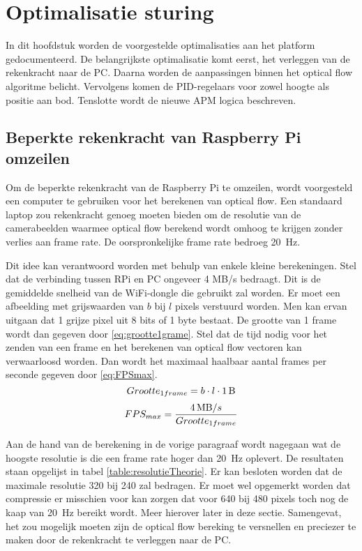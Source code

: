 \chapter{Optimalisatie sturing}
In dit hoofdstuk worden de voorgestelde optimalisaties aan het platform gedocumenteerd. De belangrijkste optimalisatie komt eerst, het verleggen van de rekenkracht naar de PC. Daarna worden de aanpassingen binnen het optical flow algoritme belicht. Vervolgens komen de PID-regelaars voor zowel hoogte als positie aan bod. Tenslotte wordt de nieuwe APM logica beschreven.

\section{Beperkte rekenkracht van Raspberry Pi omzeilen}
Om de beperkte rekenkracht van de Raspberry Pi te omzeilen, wordt voorgesteld een computer te gebruiken voor het berekenen van optical flow. Een standaard laptop zou rekenkracht genoeg moeten bieden om de resolutie van de camerabeelden waarmee optical flow berekend wordt omhoog te krijgen zonder verlies aan frame rate. De oorspronkelijke frame rate bedroeg \SI{20}{\Hz}.

\npar Dit idee kan verantwoord worden met behulp van enkele kleine berekeningen. Stel dat de verbinding tussen RPi en PC ongeveer 4 MB/s bedraagt. Dit is de gemiddelde snelheid van de WiFi-dongle die gebruikt zal worden. Er moet een afbeelding met grijswaarden van $b$ bij $l$ pixels verstuurd worden. Men kan ervan uitgaan dat 1 grijze pixel uit 8 bits of 1 byte bestaat. De grootte van 1 frame wordt dan gegeven door \eqref{eq:grootte1grame}. Stel dat de tijd nodig voor het zenden van een frame en het berekenen van optical flow vectoren kan verwaarloosd worden. Dan wordt het maximaal haalbaar aantal frames per seconde gegeven door \eqref{eq:FPSmax}.
\begin{equation}
Grootte_{1frame} = b \cdot l \cdot \SI{1}{\byte} 
\label{eq:grootte1grame}
\end{equation}
\begin{equation}
FPS_{max} = \frac{\SI{4}{\mega\byte}/s}{Grootte_{1frame}}
\label{eq:FPSmax}
\end{equation}

\npar Aan de hand van de berekening in de vorige paragraaf wordt nagegaan wat de hoogste resolutie is die een frame rate hoger dan \SI{20}{\Hz} oplevert. De resultaten staan opgelijst in tabel \ref{table:resolutieTheorie}. Er kan besloten worden dat de maximale resolutie 320 bij 240 zal bedragen. Er moet wel opgemerkt worden dat compressie er misschien voor kan zorgen dat voor 640 bij 480 pixels toch nog de kaap van \SI{20}{\Hz} bereikt wordt. Meer hierover later in deze sectie. Samengevat, het zou mogelijk moeten zijn de optical flow bereking te versnellen en preciezer te maken door de rekenkracht te verleggen naar de PC.


